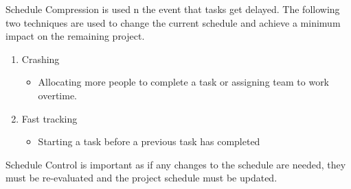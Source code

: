 Schedule Compression is used n the event that tasks get delayed. The following two techniques are used to change the current schedule and achieve a minimum impact on the remaining project. 

\begin{enumerate}
\item Crashing 
\begin{itemize}
\item Allocating more people to complete a task or assigning team to work overtime.
\end{itemize}
\item Fast tracking
\begin{itemize}
\item Starting a task before a previous task has completed
\end{itemize}
\end{enumerate}

Schedule Control is important as if any changes to the schedule are needed, they must be re-evaluated and the project schedule must be updated.  
